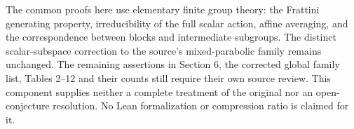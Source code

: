 \documentclass[11pt,a4paper]{article}
\begin{document}
The common proofs here use elementary finite group theory:
the Frattini generating property, irreducibility of the full scalar
action, affine averaging, and the correspondence between blocks
and intermediate subgroups. The distinct scalar-subspace correction
to the source's mixed-parabolic family remains unchanged. The
remaining assertions in Section 6, the corrected global family
list, Tables 2--12 and their counts still require their own
source review. This component supplies neither a complete
treatment of the original nor an open-conjecture resolution.
No Lean formalization or compression ratio is claimed for it.
\end{document}
